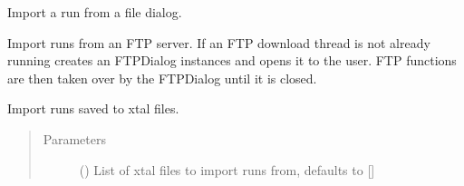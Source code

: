 \documentclass[letterpaper,10pt,english]{sphinxmanual}
\begin{document}
\begin{fulllineitems}
\begin{fulllineitems}
\label{\detokenize{polo.widgets:polo.widgets.run_organizer.RunOrganizer.import_run_from_dialog}}
Import a run from a file dialog.

\end{fulllineitems}


\begin{fulllineitems}
\label{\detokenize{polo.widgets:polo.widgets.run_organizer.RunOrganizer.import_run_from_ftp}}
Import runs from an FTP server. If an FTP download thread is not already
running creates an FTPDialog instances and opens it to the user. FTP functions
are then taken over by the FTPDialog until it is closed.

\end{fulllineitems}


\begin{fulllineitems}
\label{\detokenize{polo.widgets:polo.widgets.run_organizer.RunOrganizer.import_saved_runs}}
Import runs saved to xtal files.
\begin{quote}\begin{description}
\item[{Parameters}] \leavevmode
{} (\sphinxstyleliteralemphasis{\sphinxupquote{, }}) \textendash{} List of xtal files to import runs from, defaults to {[}{]}

\end{description}\end{quote}

\end{fulllineitems}



\end{fulllineitems}
\end{document}
